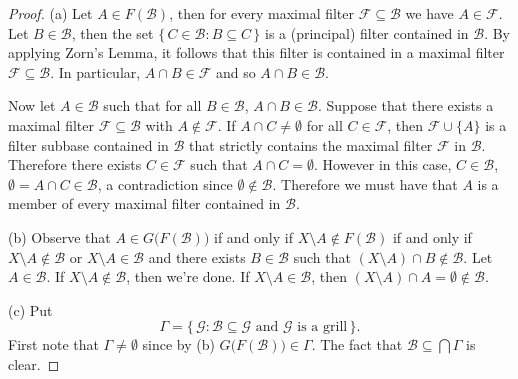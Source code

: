 \documentclass[12pt]{article}
\theoremstyle{plain}
\theoremstyle{definition}
\newcommand{\calB}{\mathcal{B}}
\newcommand{\calF}{\mathcal{F}}
\newcommand{\calG}{\mathcal{G}}
\begin{document}
\begin{proof}
  (a) 
  Let $A \in F(\calB)$, then for every maximal filter $\calF \subseteq \calB$ we have $A \in \calF$. 
  Let $B \in \calB$, then the set $\{\, C \in \calB : B \subseteq C \,\}$ is a (principal) filter contained in $\calB$.
  By applying Zorn's Lemma, it follows that this filter is contained in a maximal filter $\calF \subseteq \calB$.
  In particular, $A \cap B \in \calF$ and so $A \cap B \in \calB$.

  Now let $A \in \calB$ such that for all $B \in \calB$, $A \cap B \in \calB$.
  Suppose that there exists a maximal filter $\calF \subseteq \calB$ with $A \not\in \calF$. 
  If $A \cap C \ne \emptyset$ for all $C \in \calF$, then $\calF \cup \{A\}$ is a filter subbase contained in $\calB$ that strictly contains the maximal filter $\calF$ in $\calB$.
  Therefore there exists $C \in \calF$ such that $A \cap C = \emptyset$.
  However in this case, $C \in \calB$, $\emptyset = A \cap C \in \calB$, a contradiction since $\emptyset \not\in \calB$.
  Therefore we must have that $A$ is a member of every maximal filter contained in $\calB$.

  (b)
  Observe that $A \in G\bigl(F(\calB)\bigr)$ if and only if $X \setminus A \not\in F(\calB)$ if and only if $X \setminus A \not\in \calB$ or $X \setminus A \in \calB$ and there exists $B \in \calB$ such that $(X \setminus A) \cap B \not\in \calB$.
  Let $A \in \calB$. 
  If $X \setminus A \not\in \calB$, then we're done.
  If $X \setminus A \in \calB$, then $(X \setminus A) \cap A = \emptyset \not\in \calB$.

  (c)
  Put
  \[
    \Gamma = \{\, \calG : \mbox{$\calB \subseteq \calG$ and $\calG$ is a grill} \,\}.
  \]
  First note that $\Gamma \ne \emptyset$ since by (b) $G\bigl(F(\calB)\bigr) \in \Gamma$.
  The fact that $\calB \subseteq \bigcap\Gamma$ is clear.


\end{proof}
\end{document}
